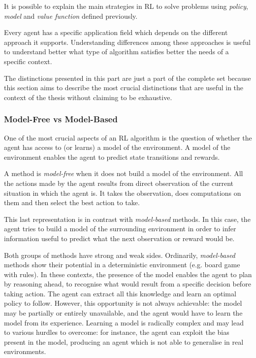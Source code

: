 It is possible to explain the main strategies in RL to solve problems using \textit{policy}, \textit{model} and \textit{value function} defined previously.

Every agent has a specific application field which depends on the different approach it supports.
Understanding differences among these approaches is useful to understand better what type of algorithm satisfies better the needs of a specific context.

The distinctions presented in this part are just a part of the complete set because this section aims to describe the most crucial distinctions that are useful in the context of the thesis without claiming to be exhaustive.

\subsubsection{Model-Free vs Model-Based}

One of the most crucial aspects of an RL algorithm is the question of whether the agent has access to (or learns) a model of the environment. A model of the environment enables the agent to predict state transitions and rewards.

A method is \textit{model-free} when it does not build a model of the environment. All the actions made by the agent results from direct observation of the current situation in which the agent is. It takes the observation, does computations on them and then select the best action to take.

This last representation is in contrast with \textit{model-based} methods. In this case, the agent tries to build a model of the surrounding environment in order to infer information useful to predict what the next observation or reward would be.

Both groups of methods have strong and weak sides.
Ordinarily, \textit{model-based} methods show their potential in a deterministic environment (e.g. board game with rules). In these contexts, the presence of the model enables the agent to plan by reasoning ahead, to recognise what would result from a specific decision before taking action. The agent can extract all this knowledge and learn an optimal policy to follow. However, this opportunity is not always achievable: the model may be partially or entirely unavailable, and the agent would have to learn the model from its experience. Learning a model is radically complex and may lead to various hurdles to overcome: for instance, the agent can exploit the bias present in the model, producing an agent which is not able to generalise in real environments.

